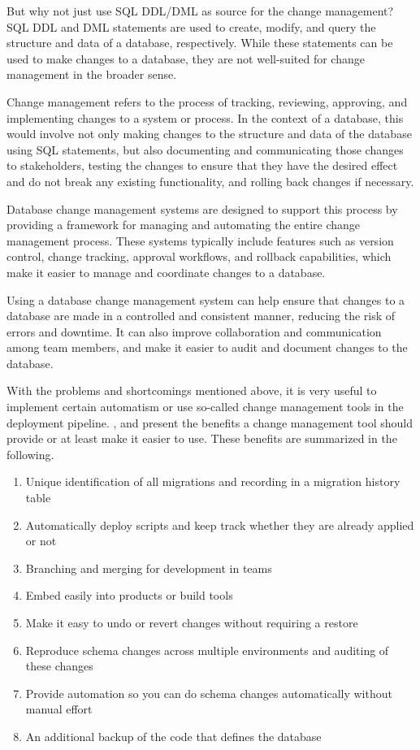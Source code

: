 %
But why not just use SQL DDL/DML as source for the change management?
SQL DDL and DML statements are used to create, modify, and query the structure and data of a database, respectively. While these statements can be used to make changes to a database, they are not well-suited for change management in the broader sense.

Change management refers to the process of tracking, reviewing, approving, and implementing changes to a system or process. In the context of a database, this would involve not only making changes to the structure and data of the database using SQL statements, but also documenting and communicating those changes to stakeholders, testing the changes to ensure that they have the desired effect and do not break any existing functionality, and rolling back changes if necessary.

Database change management systems are designed to support this process by providing a framework for managing and automating the entire change management process. These systems typically include features such as version control, change tracking, approval workflows, and rollback capabilities, which make it easier to manage and coordinate changes to a database.

Using a database change management system can help ensure that changes to a database are made in a controlled and consistent manner, reducing the risk of errors and downtime. It can also improve collaboration and communication among team members, and make it easier to audit and document changes to the database.
 
%
With the problems and shortcomings mentioned above, it is very useful to implement certain automatism or use so-called change management tools in the deployment pipeline.
\cite{Dillon2022}, \cite{Robles2021} and \cite{Fritchey2022} present the benefits a change management tool should provide or at least make it easier to use. These benefits are summarized in the following.

\begin{enumerate}
	\item Unique identification of all migrations and recording in a migration history table
    \item Automatically deploy scripts and keep track whether they are already applied or not
    \item Branching and merging for development in teams
    \item Embed easily into products or build tools
    \item Make it easy to undo or revert changes without requiring a restore
    \item Reproduce schema changes across multiple environments and auditing of these changes
    \item Provide automation so you can do schema changes automatically without manual effort
    \item An additional backup of the code that defines the database
\end{enumerate}


